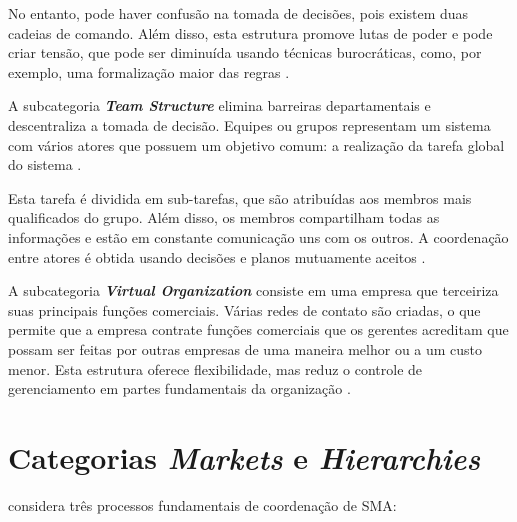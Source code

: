 No entanto, pode haver confusão na tomada de decisões, pois existem duas cadeias de comando. Além disso, esta estrutura promove lutas de poder e pode criar tensão, que pode ser diminuída usando técnicas burocráticas, como, por exemplo, uma formalização maior das regras \cite{Argente200655}.

A subcategoria \textit{\textbf{Team Structure}} elimina barreiras departamentais e descentraliza a tomada de decisão. Equipes ou grupos representam um sistema com vários atores que possuem um objetivo comum: a realização da tarefa global do sistema \cite{Argente200655}.

Esta tarefa é dividida em sub-tarefas, que são atribuídas aos membros mais qualificados do grupo. Além disso, os membros compartilham todas as informações e estão em constante comunicação uns com os outros. A coordenação entre atores é obtida usando decisões e planos mutuamente aceitos \cite{Argente200655}. 


A subcategoria \textit{\textbf{Virtual Organization}} consiste em uma empresa que terceiriza suas principais funções comerciais. Várias redes de contato são criadas, o que permite que a empresa contrate funções comerciais que os gerentes acreditam que possam ser feitas por outras empresas de uma maneira melhor ou a um custo menor. Esta estrutura oferece flexibilidade, mas reduz o controle de gerenciamento em partes fundamentais da organização \cite{Argente200655}. 

\section{Categorias \textit{Markets} e \textit{Hierarchies}}


 considera três processos fundamentais de coordenação de SMA:

